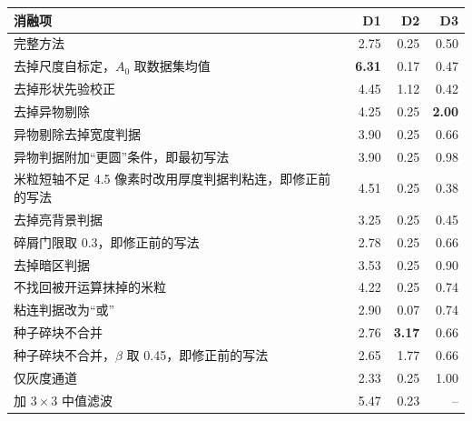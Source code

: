 \begin{tabular}{lrrr}
\toprule
消融项 & D1 & D2 & D3 \\
\midrule
完整方法 & 2.75 & 0.25 & 0.50 \\
去掉尺度自标定，$A_0$ 取数据集均值 & \textbf{6.31} & 0.17 & 0.47 \\
去掉形状先验校正 & 4.45 & 1.12 & 0.42 \\
去掉异物剔除 & 4.25 & 0.25 & \textbf{2.00} \\
异物剔除去掉宽度判据 & 3.90 & 0.25 & 0.66 \\
异物判据附加“更圆”条件，即最初写法 & 3.90 & 0.25 & 0.98 \\
米粒短轴不足 4.5 像素时改用厚度判据判粘连，即修正前的写法 & 4.51 & 0.25 & 0.38 \\
去掉亮背景判据 & 3.25 & 0.25 & 0.45 \\
碎屑门限取 0.3，即修正前的写法 & 2.78 & 0.25 & 0.66 \\
去掉暗区判据 & 3.53 & 0.25 & 0.90 \\
不找回被开运算抹掉的米粒 & 4.22 & 0.25 & 0.74 \\
粘连判据改为“或” & 2.90 & 0.07 & 0.74 \\
种子碎块不合并 & 2.76 & \textbf{3.17} & 0.66 \\
种子碎块不合并，$\beta$ 取 0.45，即修正前的写法 & 2.65 & 1.77 & 0.66 \\
仅灰度通道 & 2.33 & 0.25 & 1.00 \\
加 $3\times3$ 中值滤波 & 5.47 & 0.23 & -- \\
\bottomrule
\end{tabular}